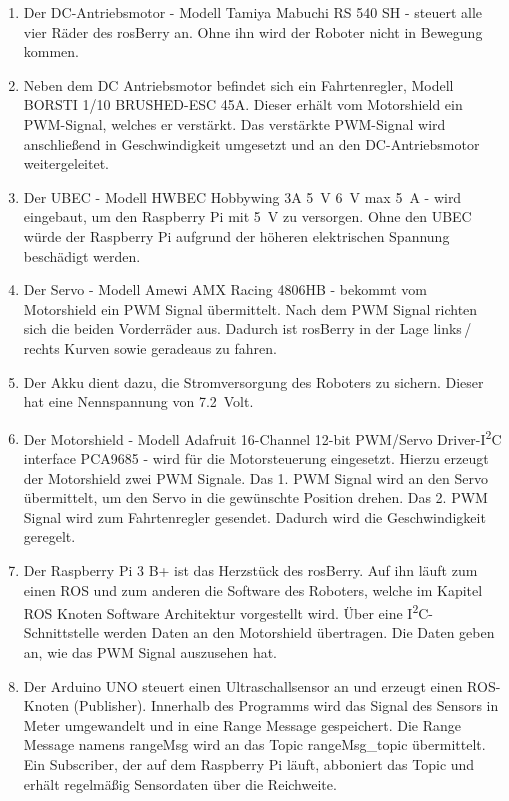 \documentclass[conference]{IEEEtran}
\begin{document}
	\begin{enumerate}
		\item Der DC-Antriebsmotor - Modell Tamiya Mabuchi RS 540 SH - steuert alle vier Räder des rosBerry an.
		Ohne ihn wird der Roboter nicht in Bewegung kommen.
		\item Neben dem DC Antriebsmotor befindet sich ein Fahrtenregler, Modell BORSTI 1/10 BRUSHED-ESC 45A.
		Dieser erhält vom Motorshield ein PWM-Signal, welches er verstärkt.
		Das verstärkte PWM-Signal wird anschließend in Geschwindigkeit umgesetzt und an den DC-Antriebsmotor weitergeleitet.
		\item Der UBEC - Modell HWBEC Hobbywing 3A \SI{5}{V} \SI{6}{V} max \SI{5}{A} - wird eingebaut, um den Raspberry Pi mit \SI{5}{V} zu versorgen.
		Ohne den UBEC würde der Raspberry Pi aufgrund der höheren elektrischen Spannung beschädigt werden.
		\item Der Servo - Modell Amewi AMX Racing 4806HB - bekommt vom Motorshield ein PWM Signal übermittelt.
		Nach dem PWM Signal richten sich die beiden Vorderräder aus.
		Dadurch ist rosBerry in der Lage links\,/\,rechts Kurven sowie geradeaus zu fahren.
		\item Der Akku dient dazu, die Stromversorgung des Roboters zu sichern.
		Dieser hat eine Nennspannung von \SI{7,2}{Volt}. 
		\item Der Motorshield - Modell Adafruit 16-Channel 12-bit PWM/Servo 
		Driver-I\textsuperscript{2}C interface PCA9685 - wird für die 
		Motorsteuerung eingesetzt.
		Hierzu erzeugt der Motorshield zwei PWM Signale.
		Das 1. PWM Signal wird an den Servo übermittelt, um den Servo in die 
		gewünschte Position drehen.
		Das 2. PWM Signal wird zum Fahrtenregler gesendet.
		Dadurch wird die Geschwindigkeit geregelt.
		\item Der Raspberry Pi 3 B+ ist das Herzstück des rosBerry.
		Auf ihn läuft zum einen ROS und zum anderen die Software des Roboters, welche im Kapitel ROS Knoten Software Architektur vorgestellt wird.
		Über eine I\textsuperscript{2}C-Schnittstelle werden Daten an den 
		Motorshield übertragen.
		Die Daten geben an, wie das PWM Signal auszusehen hat.
		\item Der Arduino UNO steuert einen Ultraschallsensor an und erzeugt 
		einen ROS-Knoten (Publisher).
		Innerhalb des Programms wird das Signal des Sensors in Meter umgewandelt und in eine Range Message gespeichert.
		Die Range Message namens rangeMsg wird an das Topic rangeMsg\_topic übermittelt.
		Ein Subscriber, der auf dem Raspberry Pi läuft, abboniert das Topic und erhält regelmäßig Sensordaten über die Reichweite.
		

\end{enumerate}
\end{document}
